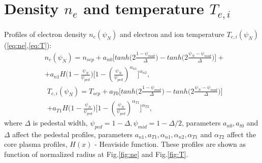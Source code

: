 \documentclass[11pt,oneside,a4paper,notitlepage]{article}
\begin{document}
\section{Density $n_e$ and temperature $T_{e,i}$}
Profiles of electron density $n_e(\psi_N)$ and electron and ion temperature $T_{e,i}(\psi_N)$ 
(\ref{eq:ne},\ref{eq:T}):
\begin{equation}\label{eq:ne}
\begin{split}
 &n_e(\psi_N)=n_{sep}+a_{n0}\Bigg[tanh\Bigg(2\frac{1-\psi_{mod}}{\Delta}\Bigg)- tanh\Bigg(2\frac{\psi_N-\psi_{mod}}{\Delta}\Bigg)\Bigg] +\\
 &+a_{n1}H\Bigg(1-\frac{\psi_N}{\psi_{ped}}\Bigg)\Bigg[1-(\frac{\psi_N}{\psi_{ped}})^{\alpha_{n1}}\Bigg]^{\alpha_{n2}},
 \end{split}
\end{equation}
\begin{equation}\label{eq:T}
\begin{split}
 &T_{e,i}(\psi_N)=T_{sep}+a_{T0}\Bigg[tanh\Bigg(2\frac{1-\psi_{mod}}{\Delta}\Bigg)- tanh\Bigg(2\frac{\psi_N-\psi_{mod}}{\Delta}\Bigg)\Bigg] \\
 &+a_{T1}H\Bigg(1-\frac{\psi_N}{\psi_{ped}}\Bigg)\Bigg[1-(\frac{\psi_N}{\psi_{ped}})^{\alpha_{T1}}\Bigg]^{\alpha_{T2}},
\end{split}
\end{equation}
where $\Delta$ is pedestal width, $\psi_{ped}=1-\Delta,\psi_{mid}=1-\Delta/2$, 
parameters $a_{n0},a_{t0}$ and $\Delta$ affect the pedestal profiles, 
parameters $a_{n1},a_{T1},\alpha_{n1},\alpha_{n2},\alpha_{T1}$ and $\alpha_{T2}$ affect the 
core plasma profiles, $H(x)$ - Heaviside function. These profiles are shown as function of 
normalized radius at Fig.\ref{fig:ne} and Fig.\ref{fig:T}.
\end{document}
